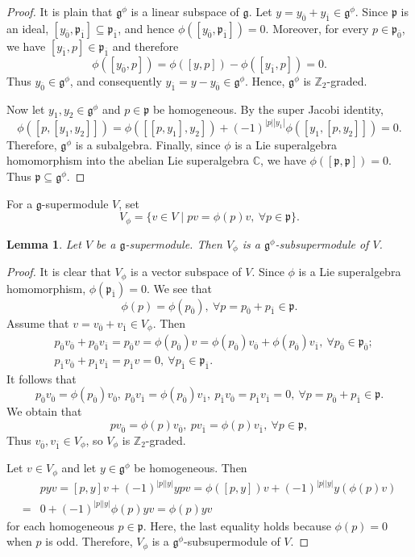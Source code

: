 \documentclass[12pt,reqno]{article}
\newtheorem{lem}[thm]{Lemma}
\def\o{\overline}
\def\F{\mathfrak}
\def\CC{\mathbb{C}}
\def\ZZ{\mathbb{Z}}
\def\beqn{\begin{equation*}}
\def\eeqn{\end{equation*}}
\def\beq{\begin{equation}}
\def\eeq{\end{equation}}
\begin{document}
\begin{proof}
It is plain that $\F{g}^\phi$ is a linear subspace of $\F{g}$. Let
$y=y_{\o{0}}+y_{\o{1}}\in\F{g}^\phi$. Since $\F{p}$ is an ideal,
$[y_{\o{0}},\F{p}_{\o{1}}]\subseteq\F{p}_{\o{1}}$, and hence
$\phi([y_{\o{0}},\F{p}_{\o{1}}])=0$. Moreover, for every
$p\in\F{p}_{\o{0}}$, we have $[y_{\o{1}},p]\in\F{p}_{\o{1}}$ and therefore
\beqn
\phi([y_{\o{0}},p])=\phi([y,p])-\phi([y_{\o{1}},p])=0.
\eeqn
Thus $y_{\o{0}}\in\F{g}^\phi$, and consequently
$y_{\o{1}}=y-y_{\o{0}}\in\F{g}^\phi$. Hence, $\F{g}^\phi$ is
$\ZZ_2$-graded.

Now let $y_1,y_2\in\F{g}^\phi$ and $p\in\F{p}$ be homogeneous. By the super Jacobi identity,
\beqn
\phi([p,[y_1,y_2]])=\phi([[p,y_1],y_2])+(-1)^{|p||y_1|}\phi([y_1,[p,y_2]])=0.
\eeqn
Therefore, $\F{g}^\phi$ is a subalgebra. Finally, since $\phi$ is a Lie superalgebra homomorphism into the abelian Lie superalgebra $\CC$, we have $\phi([\F{p},\F{p}])=0$. Thus $\F{p}\subseteq\F{g}^\phi$.
\end{proof}

For a $\F{g}$-supermodule $V$, set
\beq
V_{\phi}=\{v\in V\mid pv=\phi(p)v, ~\forall p\in \F{p}\}.
\eeq

\begin{lem}\label{L2.3}
Let $V$ be a $\F{g}$-supermodule. Then $V_{\phi}$ is a $\F{g}^{\phi}$-subsupermodule of $V$.
\end{lem}

\begin{proof}
It is clear that $V_\phi$ is a vector subspace of $V$.
Since $\phi$ is a Lie superalgebra homomorphism, $\phi(\F{p}_{\o{1}})=0$. We see that 
\beqn
\phi(p)=\phi(p_{\o{0}}), ~\forall p=p_{\o{0}}+p_{\o{1}}\in\F{p}.
\eeqn
 Assume that $v=v_{\o{0}}+v_{\o{1}}\in V_{\phi}$. Then 
\begin{align*}
&	p_{\o{0}}v_{\o{0}}+p_{\o{0}}v_{\o{1}}=p_{\o{0}}v=\phi(p_{\o{0}})v=\phi(p_{\o{0}})v_{\o{0}}+\phi(p_{\o{0}})v_{\o{1}}, ~\forall p_{\o{0}}\in\F{p}_{\o{0}};\\
&p_{\o{1}}v_{\o{0}}+p_{\o{1}}v_{\o{1}}=p_{\o{1}}v=0, ~\forall p_{\o{1}}\in \F{p}_{\o{1}}.
\end{align*}
It follows that 
\beqn
p_{\o{0}}v_{\o{0}}=\phi(p_{\o{0}})v_{\o{0}}, ~p_{\o{0}}v_{\o{1}}=\phi(p_{\o{0}})v_{\o{1}}, ~p_{\o{1}}v_{\o{0}}=p_{\o{1}}v_{\o{1}}=0, ~\forall p=p_{\o{0}}+p_{\o{1}}\in \F{p}.
\eeqn	
We obtain that
\beqn
pv_{\o{0}}=\phi(p)v_{\o{0}}, ~pv_{\o{1}}=\phi(p)v_{\o{1}}, ~\forall p\in\F{p}, 
\eeqn
Thus $v_{\o{0}},v_{\o{1}}\in V_{\phi}$, so $V_\phi$ is $\ZZ_2$-graded.

Let $v\in V_{\phi}$ and let $y\in\F{g}^{\phi}$ be homogeneous. Then
\begin{align*}
	&pyv=[p, y]v+(-1)^{|p||y|}ypv=\phi([p, y])v+(-1)^{|p||y|}y(\phi(p)v)\\
	=&0+(-1)^{|p||y|}\phi(p)yv=\phi(p)yv
\end{align*}
for each homogeneous $p\in\F{p}$.  Here, the last equality holds because $\phi(p)=0$ when $p$ is odd.
Therefore, $V_{\phi}$ is a $\F{g}^{\phi}$-subsupermodule of $V$.
\end{proof}
\end{document}
